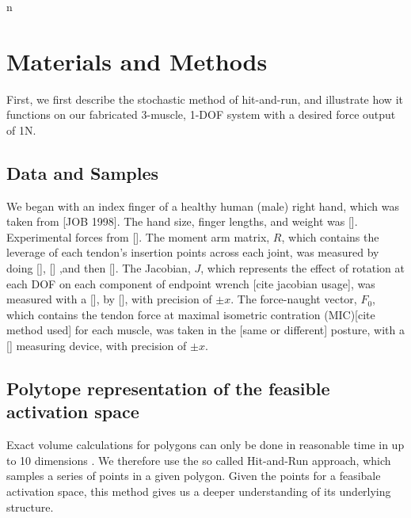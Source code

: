 n\section{Materials and Methods}

First, we first describe the stochastic method of hit-and-run, and illustrate how it functions on our fabricated 3-muscle, 1-DOF system with a desired force output of 1N.




\subsection{Data and Samples}
We began with an index finger of a healthy human (male) right hand, which was taken from [JOB 1998]. The hand size, finger lengths, and weight was []. Experimental forces from []. 
The moment arm matrix, $R$, which contains the leverage of each tendon's insertion points across each joint, was measured by doing [], [] ,and then [].
The Jacobian, $J$, which represents the effect of rotation at each DOF on each component of endpoint wrench [cite jacobian usage], was measured with a [], by [], with precision of $\pm x$.
The force-naught vector, $F_0$, which contains the tendon force at maximal isometric contration (MIC)[cite method used] for each muscle, was taken in the [same or different] posture, with a [] measuring device, with precision of $\pm x$.



\subsection{Polytope representation of the feasible activation space}
Exact volume calculations for polygons can only be done in reasonable time in up to 10 dimensions \cite{Dyer2, Khachiyan, Khachiyan2}. We therefore use the so called Hit-and-Run approach, which samples a series of points in a given polygon. Given the points for a feasibale activation space, this method gives us a deeper understanding of its underlying structure. 



